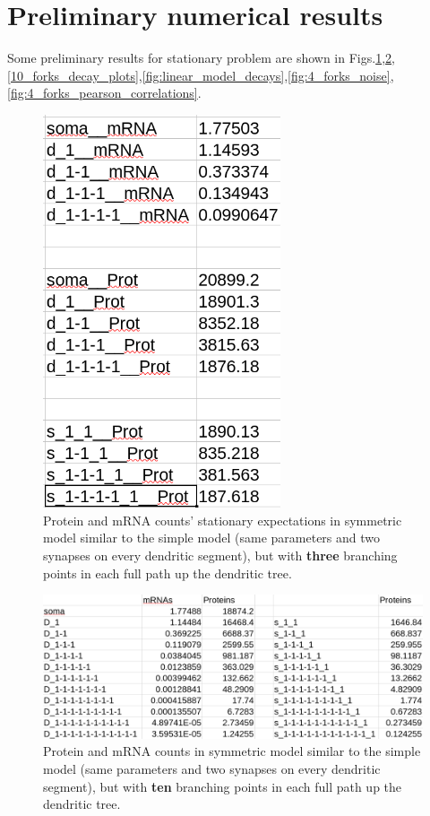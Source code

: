 \documentclass[a4paper, 11pt]{article}
\begin{document}
\section{Preliminary numerical results}
Some preliminary results for stationary problem are shown in Figs.\ref{fig:3_branching_points_numbers},\ref{fig:10_forks_combined},\ref{10_forks_decay_plots},\ref{fig:linear_model_decays},\ref{fig:4_forks_noise},\ref{fig:4_forks_pearson_correlations}.
\begin{figure}
  \begin{center}
    \includegraphics[width=7cm]{img/3_branching_points_numbers.png}
  \end{center}  
  \caption{Protein and mRNA counts' stationary expectations in symmetric model similar to the simple model (same parameters and two synapses on every dendritic segment), but with {\bf three} branching points in each full path up the dendritic tree.}
  \label{fig:3_branching_points_numbers}
\end{figure}

\begin{figure}
  \begin{center}
    \includegraphics[width=12cm]{img/10_forks_combined.png}
  \end{center}  
  \caption{Protein and mRNA counts in symmetric model similar to the simple model (same parameters and two synapses on every dendritic segment), but with {\bf ten} branching points in each full path up the dendritic tree.}
  \label{fig:10_forks_combined}
\end{figure}
\end{document}
